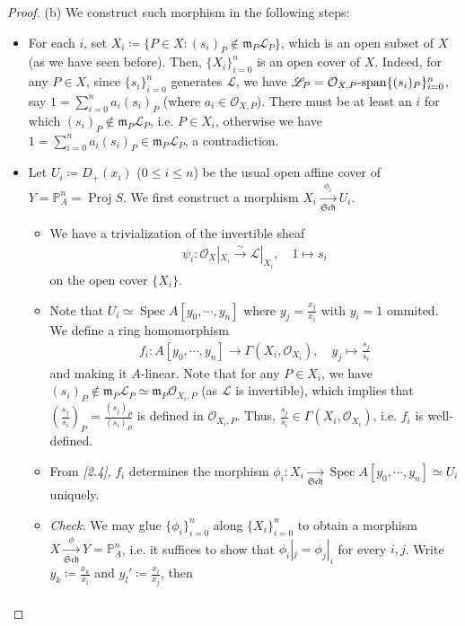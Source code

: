 \documentclass[11pt,a4paper,footinclude=true,headinclude=true]{scrbook} %
\DeclareMathOperator{\Spec}{Spec}
\DeclareMathOperator{\Proj}{Proj}
\newcommand{\LL}{\mathscr{L}}
\newcommand{\OO}{\mathcal{O}}
\newcommand{\PP}{\mathbb{P}}
\newcommand{\mm}{\mathfrak{m}}
\newcommand{\Sch}{\mathfrak{Sch}}
\newcommand{\<}{\langle}
\newcommand{\>}{\rangle}
\newcommand{\isolongto}{\overset{\sim}{\longrightarrow}}
\newcommand{\spn}{\mathchar`-\mathrm{span}}
\begin{document}
\begin{proof}
    (b) We construct such morphism in the following steps:
    \begin{itemize}
        \item For each $i$, set $X_i\coloneqq\{P\in X:(s_i)_P\notin\mm_P\LL_P\}$, which is an open subset of $X$ (as we have seen before). Then, $\{X_i\}_{i=0}^n$ is an open cover of $X$. Indeed, for any $P\in X$, since $\{s_i\}_{i=0}^n$ generates $\LL$, we have $\LL_P=\OO_{X,P}\spn\{(s_i)_P\}_{i=0}^n$, say $1=\sum_{i=0}^na_i(s_i)_P$ (where $a_i\in\OO_{X,P}$). There must be at least an $i$ for which $(s_i)_P\notin\mm_P\LL_P$, i.e. $P\in X_i$, otherwise we have $1=\sum_{i=0}^na_i(s_i)_P\in\mm_P\LL_P$, a contradiction.
        \item Let $U_i\coloneqq D_+(x_i)$ ($0\leq i\leq n$) be the usual open affine cover of $Y=\PP_A^n=\Proj S$. We first construct a morphism $X_i\xrightarrow[\Sch]{\phi_i}U_i$.
        \begin{itemize}
            \item We have a trivialization of the invertible sheaf
            \begin{align*}
                \psi_i:\OO_X|_{X_i}\isolongto\LL|_{X_i},\quad1\longmapsto s_i
            \end{align*}
            on the open cover $\{X_i\}$.
            \item Note that $U_i\simeq\Spec A[y_0,\cdots,y_n]$ where $y_j=\frac{x_j}{x_i}$ with $y_i=1$ ommited. We define a ring homomorphism
            \begin{align*}
                f_i:A[y_0,\cdots,y_n]\longrightarrow\Gamma(X_i,\OO_{X_i}),\quad y_j\longmapsto\frac{s_j}{s_i}
            \end{align*}
            and making it $A$-linear. Note that for any $P\in X_i$, we have $(s_i)_P\notin\mm_P\LL_P\simeq\mm_P\OO_{X_i,P}$ (as $\LL$ is invertible), which implies that $(\frac{s_j}{s_i})_P=\frac{(s_j)_P}{(s_i)_P}$ is defined in $\OO_{X_i,P}$. Thus, $\frac{s_j}{s_i}\in\Gamma(X_i,\OO_{X_i})$, i.e. $f_i$ is well-defined.
            \item From \textit{[2.4]}, $f_i$ determines the morphism $\phi_i:X_i\xrightarrow[\Sch]{}\Spec A[y_0,\cdots,y_n]\simeq U_i$ uniquely.
            \item \textit{Check.} We may glue $\{\phi_i\}_{i=0}^n$ along $\{X_i\}_{i=0}^n$ to obtain a morphism $X\xrightarrow[\Sch]{\phi}Y=\PP_A^n$, i.e. it suffices to show that $\phi_i|_j=\phi_j|_i$ for every $i,j$. Write $y_k\coloneqq\frac{x_k}{x_i}$ and $y_l'\coloneqq\frac{x_l}{x_j}$, then
            \begin{gather*}

\end{gather*}
\end{itemize}
\end{itemize}
\end{proof}
\end{document}
